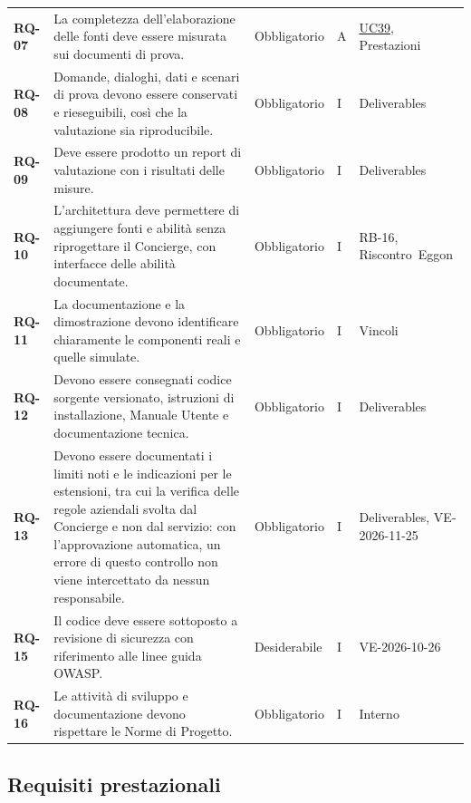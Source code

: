 \documentclass[documento]{gpt}
\begin{document}
{\begin{longtable}{@{}>{\raggedright\arraybackslash}p{1.35cm}>{\raggedright\arraybackslash}p{7.3cm}>{\raggedright\arraybackslash}p{1.9cm}>{\centering\arraybackslash}p{0.75cm}>{\raggedright\arraybackslash}p{3.1cm}@{}}
\leavevmode\hypertarget{req:RQ-07}{\textbf{RQ-07}} & La completezza dell’elaborazione delle fonti deve essere misurata sui documenti di prova. & Obbligatorio & A & \hyperref[uc:fn_carica]{UC39}, \mbox{Prestazioni} \\
\leavevmode\hypertarget{req:RQ-08}{\textbf{RQ-08}} & Domande, dialoghi, dati e scenari di prova devono essere conservati e rieseguibili, così che la valutazione sia riproducibile. & Obbligatorio & I & \mbox{Deliverables} \\
\leavevmode\hypertarget{req:RQ-09}{\textbf{RQ-09}} & Deve essere prodotto un report di valutazione con i risultati delle misure. & Obbligatorio & I & \mbox{Deliverables} \\
\leavevmode\hypertarget{req:RQ-10}{\textbf{RQ-10}} & L’architettura deve permettere di aggiungere fonti e abilità senza riprogettare il Concierge, con interfacce delle abilità documentate. & Obbligatorio & I & \mbox{RB-16}, \mbox{Riscontro Eggon} \\
\leavevmode\hypertarget{req:RQ-11}{\textbf{RQ-11}} & La documentazione e la dimostrazione devono identificare chiaramente le componenti reali e quelle simulate. & Obbligatorio & I & \mbox{Vincoli} \\
\leavevmode\hypertarget{req:RQ-12}{\textbf{RQ-12}} & Devono essere consegnati codice sorgente versionato, istruzioni di installazione, Manuale Utente e documentazione tecnica. & Obbligatorio & I & \mbox{Deliverables} \\
\leavevmode\hypertarget{req:RQ-13}{\textbf{RQ-13}} & Devono essere documentati i limiti noti e le indicazioni per le estensioni, tra cui la verifica delle regole aziendali svolta dal Concierge e non dal servizio: con l’approvazione automatica, un errore di questo controllo non viene intercettato da nessun responsabile. & Obbligatorio & I & \mbox{Deliverables}, \mbox{VE-2026-11-25} \\
\leavevmode\hypertarget{req:RQ-15}{\textbf{RQ-15}} & Il codice deve essere sottoposto a revisione di sicurezza con riferimento alle linee guida OWASP. & Desiderabile & I & \mbox{VE-2026-10-26} \\
\leavevmode\hypertarget{req:RQ-16}{\textbf{RQ-16}} & Le attività di sviluppo e documentazione devono rispettare le Norme di Progetto. & Obbligatorio & I & \mbox{Interno} \\
\end{longtable}}

\subsection{Requisiti prestazionali}\label{sec:rp}
\end{document}

